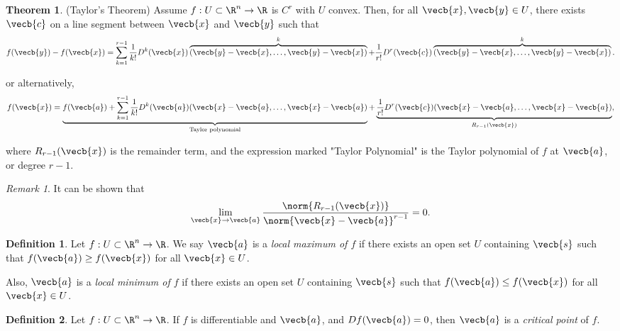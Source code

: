 \documentclass[a5paper]{article}
\theoremstyle{definition}%
\newtheorem{theorem}{Theorem}
\newtheorem*{definition*}{Definition}
\numberwithin{exercise}{section}
\theoremstyle{remark}%
\newtheorem*{remark*}{Remark}
\begin{document}
\begin{highlight}
\begin{theorem}(Taylor's Theorem)
Assume $f:U\subset \R^n\to \R$ is $C^r$ with $U$ convex. Then, for all $\vecb{x}, \vecb{y}\in U$, there exists $\vecb{c}$ on a line segment between $\vecb{x}$ and $\vecb{y}$ such that 
$$f(\vecb{y})- f(\vecb{x})=\sum_{k=1}^{r-1}\frac{1}{k!}D^k(\vecb{x})\overbrace{(\vecb{y}-\vecb{x}, \ldots, \vecb{y}-\vecb{x})}^{k}+\frac{1}{r!}D^r(\vecb{c})\overbrace{(\vecb{y}-\vecb{x}, \ldots, \vecb{y}-\vecb{x})}^{k}.$$

or alternatively, 
$$f(\vecb{x})=\underbrace{f(\vecb{a}) + \sum_{k=1}^{r-1}\frac{1}{k!}D^k(\vecb{a})(\vecb{x}-\vecb{a}, \ldots, \vecb{x}-\vecb{a})}_{\text{Taylor polynomial}}+\underbrace{\frac{1}{r!}D^r(\vecb{c})(\vecb{x}-\vecb{a}, \ldots, \vecb{x}-\vecb{a})}_{R_{r-1}(\vecb{x})},$$

where $R_{r-1}(\vecb{x})$ is the remainder term, and the expression marked "Taylor Polynomial" is the Taylor polynomial of $f$ at $\vecb{a}$, or degree $r-1$. 
\end{theorem}
\end{highlight}

\begin{remark*}
It can be shown that $$\lim\limits_{\vecb{x}\to\vecb{a}}\frac{\norm{R_{r-1}(\vecb{x})}}{\norm{\vecb{x}-\vecb{a}}^{r-1}}=0.$$ 
\end{remark*}

\begin{highlight}
\begin{definition*}
Let $f:U\subset \R^n\to \R$. We say $\vecb{a}$ is a \emph{local maximum of $f$} if there exists an open set $U$ containing $\vecb{s}$ such that $f(\vecb{a})\geq f(\vecb{x})$ for all $\vecb{x}\in U$. 
\mbox{}

Also, $\vecb{a}$ is a \emph{local minimum of $f$} if there exists an open set $U$ containing $\vecb{s}$ such that $f(\vecb{a})\leq f(\vecb{x})$ for all $\vecb{x}\in U$. 
\end{definition*}
\end{highlight}

\begin{highlight}
\begin{definition*}
Let $f:U\subset \R^n\to \R$. If $f$ is differentiable and $\vecb{a}$, and $Df(\vecb{a})=0$, then $\vecb{a}$ is a \emph{critical point} of $f$. 
\end{definition*}
\end{highlight}
\end{document}
